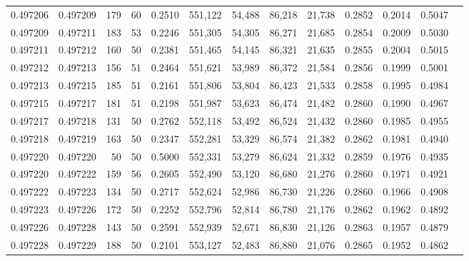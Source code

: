\begin{tabular}{rrrrrrrrrrrrr}
0.497206 & 0.497209 &   179 &  60 &                                     0.2510 & 551,122 &  54,488 &  86,218 &  21,738 & 0.2852 & 0.2014 & 0.5047 \\
0.497209 & 0.497211 &   183 &  53 &                                     0.2246 & 551,305 &  54,305 &  86,271 &  21,685 & 0.2854 & 0.2009 & 0.5030 \\
0.497211 & 0.497212 &   160 &  50 &                                     0.2381 & 551,465 &  54,145 &  86,321 &  21,635 & 0.2855 & 0.2004 & 0.5015 \\
0.497212 & 0.497213 &   156 &  51 &                                     0.2464 & 551,621 &  53,989 &  86,372 &  21,584 & 0.2856 & 0.1999 & 0.5001 \\
0.497213 & 0.497215 &   185 &  51 &                                     0.2161 & 551,806 &  53,804 &  86,423 &  21,533 & 0.2858 & 0.1995 & 0.4984 \\
0.497215 & 0.497217 &   181 &  51 &                                     0.2198 & 551,987 &  53,623 &  86,474 &  21,482 & 0.2860 & 0.1990 & 0.4967 \\
0.497217 & 0.497218 &   131 &  50 &                                     0.2762 & 552,118 &  53,492 &  86,524 &  21,432 & 0.2860 & 0.1985 & 0.4955 \\
0.497218 & 0.497219 &   163 &  50 &                                     0.2347 & 552,281 &  53,329 &  86,574 &  21,382 & 0.2862 & 0.1981 & 0.4940 \\
0.497220 & 0.497220 &    50 &  50 &                                     0.5000 & 552,331 &  53,279 &  86,624 &  21,332 & 0.2859 & 0.1976 & 0.4935 \\
0.497220 & 0.497222 &   159 &  56 &                                     0.2605 & 552,490 &  53,120 &  86,680 &  21,276 & 0.2860 & 0.1971 & 0.4921 \\
0.497222 & 0.497223 &   134 &  50 &                                     0.2717 & 552,624 &  52,986 &  86,730 &  21,226 & 0.2860 & 0.1966 & 0.4908 \\
0.497223 & 0.497226 &   172 &  50 &                                     0.2252 & 552,796 &  52,814 &  86,780 &  21,176 & 0.2862 & 0.1962 & 0.4892 \\
0.497226 & 0.497228 &   143 &  50 &                                     0.2591 & 552,939 &  52,671 &  86,830 &  21,126 & 0.2863 & 0.1957 & 0.4879 \\
0.497228 & 0.497229 &   188 &  50 &                                     0.2101 & 553,127 &  52,483 &  86,880 &  21,076 & 0.2865 & 0.1952 & 0.4862 \\

\end{tabular}
